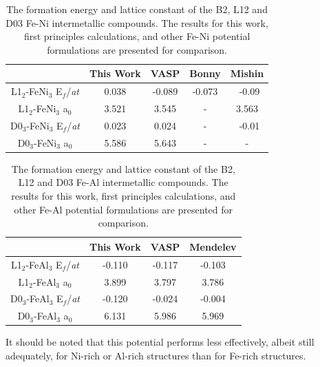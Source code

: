\documentclass[review]{elsarticle}
\begin{document}
\begin{table}[htbp]
\caption{The formation energy and lattice constant of the B2, L12 and D03 Fe-Ni intermetallic compounds.  The results for this work, first principles calculations, and other Fe-Ni potential formulations are presented for comparison.}
\begin{center}
\begin{tabular}{|c|c|c|c|c|}
	\hline
	& This Work & VASP\cite{mishin2005} & Bonny \cite{bonny2009} & Mishin\cite{mishin2005} \\
	 \hline
	 L1$_{2}$-FeNi$_{3}$ E$_{f}$/\textit{at} & 0.038 & -0.089 & -0.073 & ~-0.09 \\
	 L1$_{2}$-FeNi$_{3}$ a$_{0}$ & 3.521 & 3.545 & - & 3.563 \\
	 D0$_{3}$-FeNi$_{3}$ E$_{f}$/\textit{at} & 0.023 & 0.024 & - & ~-0.01 \\
	 D0$_{3}$-FeNi$_{3}$ a$_{0}$ & 5.586 & 5.643 & - & - \\
	 
	 	 \hline
\end{tabular}
\end{center}
\label{default}
\end{table}%

\begin{table}[htbp]
\caption{The formation energy and lattice constant of the B2, L12 and D03 Fe-Al intermetallic compounds.  The results for this work, first principles calculations, and other Fe-Al potential formulations are presented for comparison.}
\begin{center}
\begin{tabular}{|c|c|c|c|}
	\hline
	& This Work & VASP & Mendelev\cite{mendelev2005} \\
	 \hline
	 L1$_{2}$-FeAl$_{3}$ E$_{f}$/\textit{at} & -0.110 & -0.117  & -0.103 \\
	 L1$_{2}$-FeAl$_{3}$ a$_{0}$ & 3.899 & 3.797 & 3.786  \\
	 D0$_{3}$-FeAl$_{3}$ E$_{f}$/\textit{at} & -0.120 & -0.024 & -0.004 \\
	 D0$_{3}$-FeAl$_{3}$ a$_{0}$ & 6.131 & 5.986 & 5.969 \\	 
	 	 \hline
\end{tabular}
\end{center}
\label{default}
\end{table}%

It should be noted that this potential performs less effectively, albeit still adequately, for Ni-rich or Al-rich structures than for Fe-rich structures.  
\end{document}
